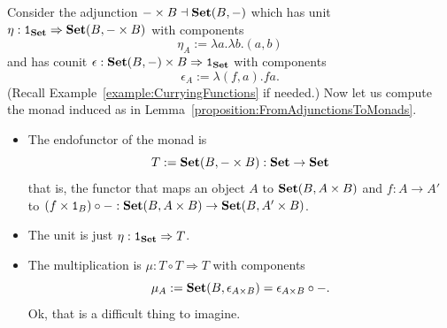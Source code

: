\begin{example}
  Consider the adjunction \(- \times B \dashv \mathbf{Set}(B, -)\) which has unit
  \(\eta : \mathtt 1_{\mathbf{Set}} \Rightarrow \mathbf{Set}(B, - \times B)\) with components
  \[
    \eta_A := \lambda a . \lambda b . (a, b)
  \]
  and has counit \(\epsilon : \mathbf{Set}(B, -) \times B \Rightarrow \mathtt 1_{\mathbf{Set}}\) with components
  \[
    \epsilon_A := \lambda (f, a) . f a .
  \]
  (Recall Example~\ref{example:CurryingFunctions} if needed.) Now let us
  compute the monad induced as in
  Lemma~\ref{proposition:FromAdjunctionsToMonads}.
  \begin{itemize}
  \item The endofunctor of the monad is
    \[
      T := \mathbf{Set}(B, - \times B) : \mathbf{Set} \to \mathbf{Set}
    \]
    that is, the functor that maps an object \(A\) to
    \(\mathbf{Set}(B, A \times B)\) and \(f : A \to A'\) to
    \((f \times \mathtt 1_B) \circ - : \mathbf{Set}(B, A \times B) \to \mathbf{Set}(B, A' \times B)\).
  \item The unit is just \(\eta : \mathtt 1_{\mathbf{Set}} \Rightarrow T\).
  \item The multiplication is \(\mu : T \circ T \Rightarrow T\) with components
    \[
      \mu_A := \mathbf{Set}(B, \epsilon_{A \times B}) = \epsilon_{A \times B} \circ - .
    \]
    Ok, that is a difficult thing to imagine.
  \end{itemize}
\end{example}

